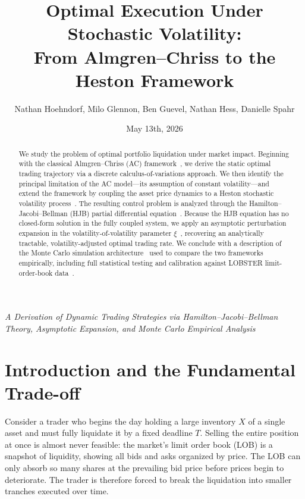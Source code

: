 \documentclass[11pt]{article}
\title{Optimal Execution Under Stochastic Volatility:\\
From Almgren--Chriss to the Heston Framework}
\author{Nathan Hoehndorf, Milo Glennon, Ben Guevel, Nathan Hess, Danielle Spahr}
\date{May 13th, 2026}
\begin{document}
\maketitle

\begin{center}
\textit{A Derivation of Dynamic Trading Strategies via Hamilton--Jacobi--Bellman Theory,
Asymptotic Expansion, and Monte Carlo Empirical Analysis}
\end{center}

\vspace{1em}

\begin{abstract}
We study the problem of optimal portfolio liquidation under market impact.
Beginning with the classical Almgren--Chriss (AC) framework~\cite{almgren2001optimal},
we derive the static optimal trading trajectory via a discrete calculus-of-variations approach.
We then identify the principal limitation of the AC model---its assumption of constant
volatility---and extend the framework by coupling the asset price dynamics to a
Heston stochastic volatility process~\cite{heston1993closed}.
The resulting control problem is analyzed through the
Hamilton--Jacobi--Bellman (HJB) partial differential equation~\cite{fleming2006controlled}.
Because the HJB equation has no closed-form solution in the fully coupled system, we apply an
asymptotic perturbation expansion in the volatility-of-volatility parameter $\xi$~\cite{fouque2011multiscale},
recovering an analytically tractable, volatility-adjusted optimal trading rate.
We conclude with a description of the Monte Carlo simulation architecture~\cite{glasserman2004monte}
used to compare the two frameworks empirically, including full statistical testing and calibration
against LOBSTER limit-order-book data~\cite{huang2011lobster}.
\end{abstract}

\tableofcontents
\newpage

\section{Introduction and the Fundamental Trade-off}

Consider a trader who begins the day holding a large inventory $X$ of a single asset and must
fully liquidate it by a fixed deadline $T$. Selling the entire position at once is almost never
feasible: the market's limit order book (LOB) is a snapshot of liquidity, showing all bids and asks
organized by price. The LOB can only absorb so many shares at the prevailing bid price before
prices begin to deteriorate. The trader is therefore forced to break the liquidation into smaller
tranches executed over time.
\end{document}
